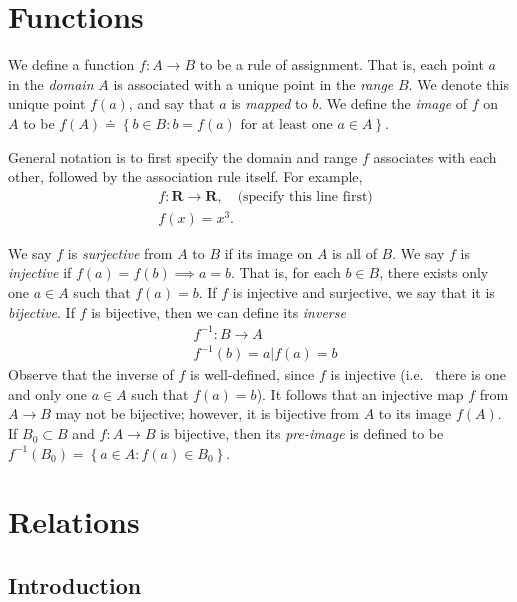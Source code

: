 \section{Functions}
We define a function $f: A \to B$ to be a rule of assignment. That is,
each point $a$ in the \emph{domain} $A$ is associated with a unique point in
the \emph{range} $B$. We denote this unique point $f(a)$, and say that
$a$ is \emph{mapped} to $b$. We define the \emph{image} of $f$ on $A$ to be
$f(A) \doteq \left\{ b \in B: b = f(a) \text{ for at least one } a \in A
\right\}$.
\begin{example}
	General notation is to first specify the domain and range $f$ associates with each
	other, followed by the association rule itself. For example,
	\begin{equation*}
		\begin{split}
			& f: \mathbf{R} \to \mathbf{R}, \quad \text{(specify this line first)}\\
			& f(x) = x^{3}.
		\end{split}
	\end{equation*}
\end{example}
We say $f$ is \emph{surjective} from $A$ to $B$ if its image on $A$ is all of
$B$. We say $f$ is \emph{injective} if $f(a) = f(b) \implies a = b$. That is,
for each $b \in B$, there exists only one $a \in A$ such that $f(a) = b$.
If $f$ is injective and surjective, we say that it is \emph{bijective}.
If $f$ is bijective, then we can define its \emph{inverse}
\begin{equation*}
	\begin{split}
		& f^{-1}: B \to A
		\\
		& f^{-1}(b) = a | f(a) = b
	\end{split}
\end{equation*}
Observe that the inverse of $f$ is well-defined, since $f$ is injective (i.e. \
there is one and only one $a \in A$ such that $f(a) = b$). It follows that
an injective map $f$ from $A \to B$ may not be bijective; however, it is
bijective from $A$ to its image $f(A)$. If $B_{0} \subset B$ and $f: A \to B$ is
bijective, then its
\emph{pre-image} is defined to be $f^{-1}(B_{0}) = \left\{ a \in A: f(a) \in
B_{0} \right\}$.
\section{Relations}
\subsection{Introduction}

